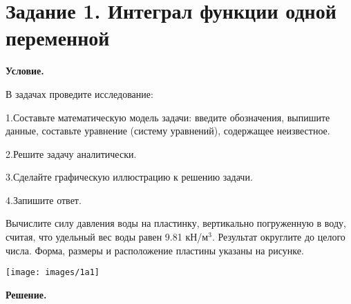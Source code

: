 \section{Задание 1. Интеграл функции одной переменной}

\textbf{Условие.}

В задачах проведите исследование:

1.Составьте математическую модель задачи: введите обозначения, выпишите данные,  составьте уравнение (систему уравнений), содержащее неизвестное.

2.Решите задачу аналитически.

3.Сделайте графическую иллюстрацию к решению задачи.

4.Запишите ответ.

\vspace{5mm}

\begin{multicols}{2}
    Вычислите силу давления воды на пластинку,
    вертикально погруженную в воду,
    считая, что удельный вес воды равен 9.81 кН/м$^3$.
    Результат округлите до целого числа.
    Форма, размеры и расположение пластины указаны на рисунке.

    \texttt{[image: images/1a1]}

\end{multicols}

\vspace{10mm}

\textbf{Решение.}

\vspace{5mm}

